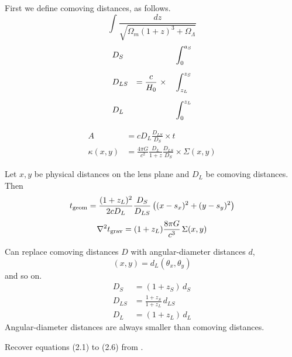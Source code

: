 \documentclass[12pt,preprint]{aastex}
\begin{document}
First we define comoving distances, as follows.
\begin{equation}
\int \frac{dz}{\sqrt{\Omega_m(1+z)^3 + \Omega_\Lambda}}
\end{equation}
\begin{equation}
\begin{aligned}
&D_S    &                                &\int_0^{a_S} \\
\noalign{\medskip}
&D_{LS} & = \frac c{H_0} \ \times \quad  &\int_{z_L}^{z_S} \\
\noalign{\medskip}
&D_L    &                                &\int_0^{z_L}
\end{aligned}
\end{equation}

\begin{equation}
\begin{aligned}
A           &= cD_L \frac{D_{LS}}{D_S} \times t \\
\kappa(x,y) &= \frac{4\pi G}{c^2} \frac{D_L}{1+z} \frac{D_{LS}}{D_S}
               \times \Sigma(x,y)
\end{aligned}
\end{equation}

Let $x,y$ be physical distances on the lens plane and $D_L$ be
comoving distances.  Then
\begin{equation}
t_{\rm geom} = \frac{(1+z_L)^2}{2cD_L} \frac{D_S}{D_{LS}}
\left( (x-s_x)^2 + (y-s_y)^2 \right)
\end{equation}
\begin{equation}
\nabla^2 t_{\rm grav} = (1+z_L)\frac{8\pi G}{c^3} \, \Sigma(x,y)
\end{equation}

Can replace comoving distances $D$ with angular-diameter distances
$d$,
\begin{equation}
(x,y) = d_L (\theta_x,\theta_y)
\end{equation}
and so on.
\begin{equation}
\begin{aligned}
D_S &= (1+z_S) \, d_S \\
D_{LS} &= \frac{1+z_S}{1+z_L} \, d_{LS} \\
D_L &= (1+z_L) \, d_L
\end{aligned}
\end{equation}
Angular-diameter distances are always smaller than comoving distances.

Recover equations (2.1) to (2.6) from \cite{1986ApJ...310..568B}.

\newpage
\end{document}
